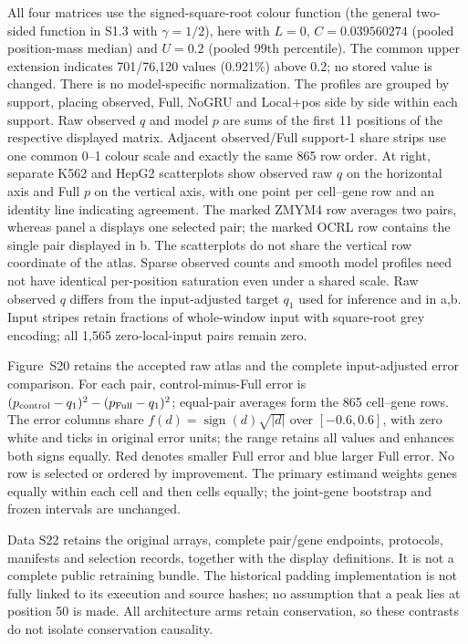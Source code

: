 \documentclass[11pt]{article}
\begin{document}
All four matrices use the signed-square-root colour function (the general two-sided function in S1.3 with $\gamma=1/2$), here with $L=0$, $C=0.039560274$ (pooled position-mass median) and $U=0.2$ (pooled 99th percentile). The common upper extension indicates 701/76,120 values (0.921\%) above 0.2; no stored value is changed. There is no model-specific normalization. The profiles are grouped by support, placing observed, Full, NoGRU and Local+pos side by side within each support. Raw observed $q$ and model $p$ are sums of the first 11 positions of the respective displayed matrix. Adjacent observed/Full support-1 share strips use one common 0--1 colour scale and exactly the same 865 row order. At right, separate K562 and HepG2 scatterplots show observed raw $q$ on the horizontal axis and Full $p$ on the vertical axis, with one point per cell--gene row and an identity line indicating agreement. The marked ZMYM4 row averages two pairs, whereas panel a displays one selected pair; the marked OCRL row contains the single pair displayed in b. The scatterplots do not share the vertical row coordinate of the atlas. Sparse observed counts and smooth model profiles need not have identical per-position saturation even under a shared scale. Raw observed $q$ differs from the input-adjusted target $q_1$ used for inference and in a,b. Input stripes retain fractions of whole-window input with square-root grey encoding; all 1,565 zero-local-input pairs remain zero.


Figure~S20 retains the accepted raw atlas and the complete input-adjusted error comparison. For each pair, control-minus-Full error is $(p_{\rm control}-q_1)^2-(p_{\rm Full}-q_1)^2$; equal-pair averages form the 865 cell--gene rows. The error columns share $f(d)=\operatorname{sign}(d)\sqrt{|d|}$ over $[-0.6,0.6]$, with zero white and ticks in original error units; the range retains all values and enhances both signs equally. Red denotes smaller Full error and blue larger Full error. No row is selected or ordered by improvement. The primary estimand weights genes equally within each cell and then cells equally; the joint-gene bootstrap and frozen intervals are unchanged.

Data S22 retains the original arrays, complete pair/gene endpoints, protocols, manifests and selection records, together with the display definitions. It is not a complete public retraining bundle. The historical padding implementation is not fully linked to its execution and source hashes; no assumption that a peak lies at position 50 is made. All architecture arms retain conservation, so these contrasts do not isolate conservation causality.
\end{document}
